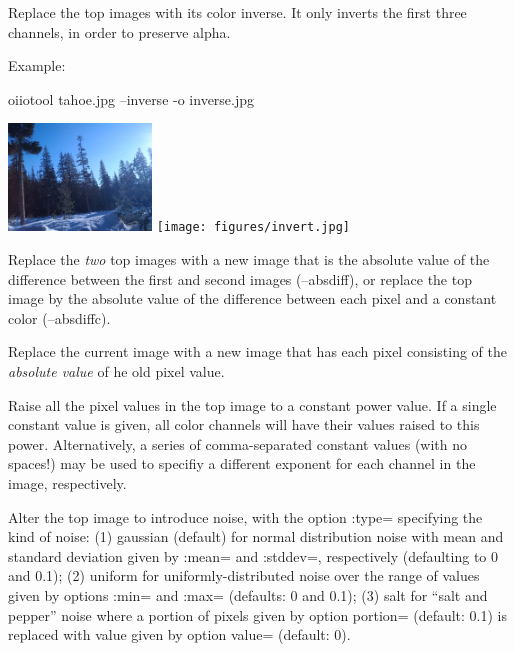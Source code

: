Replace the top images with its color inverse. It only inverts the first
three channels, in order to preserve alpha.

\noindent Example:
\begin{code}
   oiiotool tahoe.jpg --inverse -o inverse.jpg
\end{code}
\spc \includegraphics[width=1.5in]{figures/tahoe-small.jpg}
\raisebox{40pt}{\large $\rightarrow$}
\texttt{[image: figures/invert.jpg]} \\
\apiend


Replace the \emph{two} top images with a new image that is the absolute
value of the difference between the first and second images ({\cf --absdiff}),
or replace the top image by the absolute value of the difference between each
pixel and a constant color ({\cf --absdiffc}).
\apiend

Replace the current image with a new image that has each pixel
consisting of the \emph{absolute value} of he old pixel value.
\apiend

Raise all the pixel values in the top image to a constant power value.
If a single constant value is given, all color channels will have their values
raised to this power.  Alternatively, a series of
comma-separated constant values (with no spaces!) may be used to specifiy a
different exponent for each channel in the image, respectively.
\apiend

Alter the top image to introduce noise, with the option {\cf :type=}
specifying the kind of noise: (1) {\cf gaussian} (default) for normal
distribution noise with mean and standard deviation given by {\cf :mean=}
and {\cf :stddev=}, respectively (defaulting to 0 and 0.1); (2) {\cf
uniform} for uniformly-distributed noise over the range of values given by
options {\cf :min=} and {\cf :max=} (defaults: 0 and 0.1); (3) {\cf salt}
for ``salt and pepper'' noise where a portion of pixels given by  option
{\cf portion=} (default: 0.1) is replaced with value given by option {\cf
value=} (default: 0).

